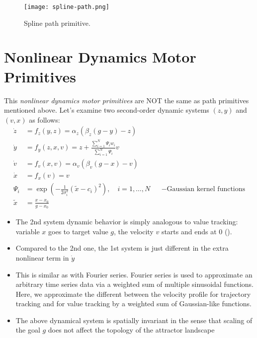 \begin{figure}[hbt!]
	\centering
	\texttt{[image: spline-path.png]}
	\caption{Spline path primitive.}
	\label{fig:spline-path}
\end{figure}

\section{Nonlinear Dynamics Motor Primitives}
This \textit{nonlinear dynamics motor primitives} are NOT the same as path primitives mentioned above. Let's examine two second-order dynamic systems $(z,y)$ and $(v,x)$ as follows: \cite{ijspeert2002movement}
\begin{align}
	\dot{z} &= f_z(y,z) = \alpha_z (\beta_z (g-y) - z)\\
	\dot{y} &= f_y(z,x,v) = z + \frac{\sum_{i=1}^N \Psi_i w_i}{\sum_{i=1}^N \Psi_i} v\\
	\dot{v} &= f_v(x,v) = \alpha_v (\beta_v (g-x) -v)\\
	\dot{x} &= f_x(v) = v\\
	\Psi_i &= \exp \left( -\frac{1}{2\sigma_i^2} (\tilde{x}-c_i)^2 \right), \quad i = 1, \dots, N &&-\text{Gaussian kernel functions}\\
	\tilde{x} &= \frac{x - x_0}{g - x_0}
\end{align}
\begin{itemize}
	\item The 2nd system dynamic behavior is simply analogous to value tracking: variable $x$ goes to target value $g$, the velocity $v$ starts and ends at 0 ().
	\item Compared to the 2nd one, the 1st system is just different in the extra nonlinear term in $\dot{y}$
	\item This is similar as with Fourier series. Fourier series is used to approximate an arbitrary time series data via a weighted sum of multiple sinusoidal functions. Here, we approximate the different between the velocity profile for trajectory tracking and for value tracking by a weighted sum of Gaussian-like functions.
	\item The above dynamical system is spatially invariant in the sense that scaling of the goal $g$ does not affect the topology of the attractor landscape
\end{itemize}


